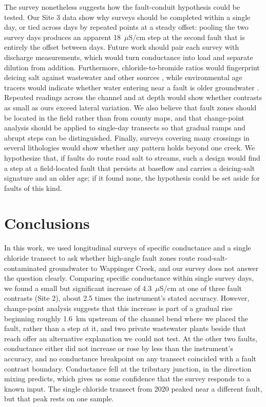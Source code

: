 \documentclass{article}
\begin{document}
The survey nonetheless suggests how the fault-conduit hypothesis could be tested. Our Site 3 data show why surveys should be completed within a single day, or tied across days by repeated points at a steady offset: pooling the two survey days produces an apparent 18~$\mu$S/cm step at the second fault that is entirely the offset between days. Future work should pair each survey with discharge measurements, which would turn conductance into load and separate dilution from addition. Furthermore, chloride-to-bromide ratios would fingerprint deicing salt against wastewater and other sources \citep{mullaney2009}, while environmental age tracers would indicate whether water entering near a fault is older groundwater \citep{cook2022}. Repeated readings across the channel and at depth would show whether contrasts as small as ours exceed lateral variation. We also believe that fault zones should be located in the field rather than from county maps, and that change-point analysis should be applied to single-day transects so that gradual ramps and abrupt steps can be distinguished. Finally, surveys covering many crossings in several lithologies would show whether any pattern holds beyond one creek. We hypothesize that, if faults do route road salt to streams, such a design would find a step at a field-located fault that persists at baseflow and carries a deicing-salt signature and an older age; if it found none, the hypothesis could be set aside for faults of this kind.

\section{Conclusions}

In this work, we used longitudinal surveys of specific conductance and a single chloride transect to ask whether high-angle fault zones route road-salt-contaminated groundwater to Wappinger Creek, and our survey does not answer the question clearly. Comparing specific conductance within single survey days, we found a small but significant increase of 4.3~$\mu$S/cm at one of three fault contrasts (Site 2), about 2.5 times the instrument's stated accuracy. However, change-point analysis suggests that this increase is part of a gradual rise beginning roughly 1.6~km upstream of the channel bend where we placed the fault, rather than a step at it, and two private wastewater plants beside that reach offer an alternative explanation we could not test. At the other two faults, conductance either did not increase or rose by less than the instrument's accuracy, and no conductance breakpoint on any transect coincided with a fault contrast boundary. Conductance fell at the tributary junction, in the direction mixing predicts, which gives us some confidence that the survey responds to a known input. The single chloride transect from 2020 peaked near a different fault, but that peak rests on one sample.
\end{document}
